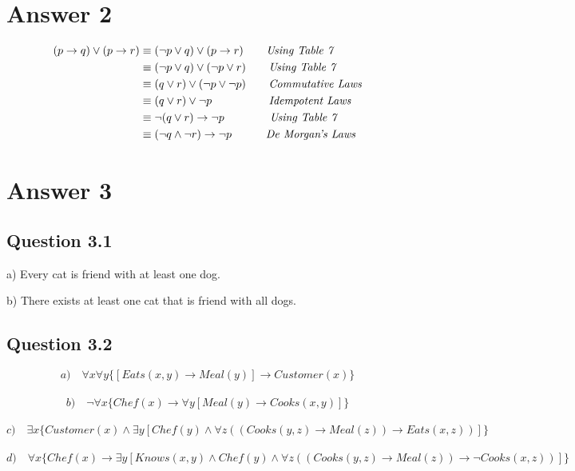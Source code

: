 \documentclass[12pt]{article}
\begin{document}
\section*{Answer 2}

\begin{equation} 
\begin{split}
(p \rightarrow q) \lor (p \rightarrow r)
& \equiv (\neg p \lor q) \lor (p \rightarrow r) \textit{\quad\quad Using Table 7}\\
& \equiv (\neg p \lor q) \lor (\neg p \lor r) \textit{\quad\quad Using Table 7}\\
& \equiv (q \lor r) \lor (\neg p \lor \neg p) \textit{\quad\quad Commutative Laws}\\
& \equiv (q \lor r) \lor \neg p \textit{\quad\quad\quad\quad\quad Idempotent Laws}\\
& \equiv \neg (q \lor r) \rightarrow \neg p \textit{\quad\quad\quad\quad Using Table 7}\\
& \equiv (\neg q \land \neg r) \rightarrow \neg p \textit{\quad\quad\quad De Morgan's Laws}
\end{split}
\end{equation}



\vspace{2cm}
\section*{Answer 3}

\subsection*{Question 3.1}
\hspace{3.6cm}
a) Every cat is friend with at least one dog. 

\hspace{3cm}
b) There exists at least one cat that is friend with all dogs.


\subsection*{Question 3.2}
\vspace{0.5cm}
$$a)\quad \forall x \forall y\{[ Eats(x,y) \rightarrow Meal(y)] \rightarrow Customer(x)\}$$\\
$$b)\quad \neg \forall x\{Chef(x) \rightarrow \forall y[Meal(y) \rightarrow Cooks(x,y)]\}$$\\
$$c)\quad \exists x \{ Customer(x) \land \exists y [ Chef(y) \land \forall z ((Cooks(y,z) \rightarrow Meal(z)) \rightarrow Eats(x,z))] \}$$\\
$$d)\quad \forall x \{ Chef(x) \rightarrow \exists y [Knows(x,y) \land Chef(y) \land \forall z ((Cooks(y,z) \rightarrow Meal(z)) \rightarrow \neg Cooks(x,z))]\}$$
\end{document}
